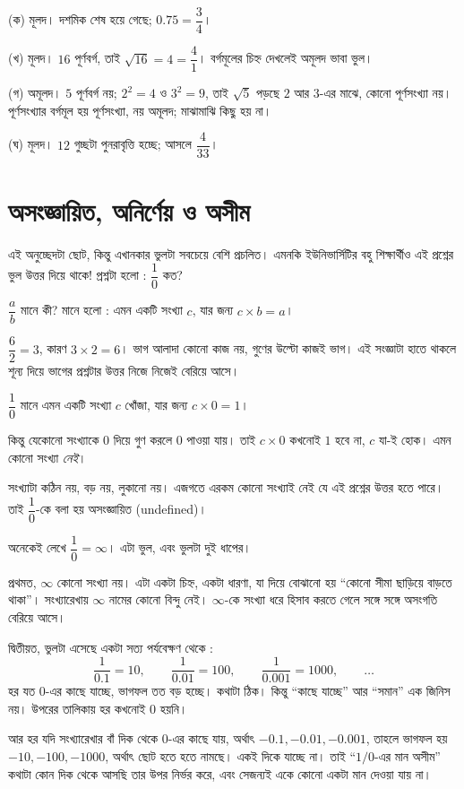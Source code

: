 \documentclass[11pt]{article}
\begin{document}
\begin{solbox}
(ক) মূলদ। দশমিক শেষ হয়ে গেছে; $0.75 = \dfrac{3}{4}$।

(খ) মূলদ। $16$ পূর্ণবর্গ, তাই $\sqrt{16} = 4 = \dfrac{4}{1}$। বর্গমূলের চিহ্ন
দেখলেই অমূলদ ভাবা ভুল।

(গ) অমূলদ। $5$ পূর্ণবর্গ নয়; $2^2 = 4$ ও $3^2 = 9$, তাই $\sqrt{5}$ পড়ছে $2$
আর $3$-এর মাঝে, কোনো পূর্ণসংখ্যা নয়। পূর্ণসংখ্যার বর্গমূল হয় পূর্ণসংখ্যা,
নয় অমূলদ; মাঝামাঝি কিছু হয় না।

(ঘ) মূলদ। $12$ গুচ্ছটা পুনরাবৃত্তি হচ্ছে; আসলে $\dfrac{4}{33}$।
\end{solbox}

\section{অসংজ্ঞায়িত, অনির্ণেয় ও অসীম}

\noindent
এই অনুচ্ছেদটা ছোট, কিন্তু এখানকার ভুলটা সবচেয়ে বেশি প্রচলিত। এমনকি ইউনিভার্সিটির বহু শিক্ষার্থীও এই প্রশ্নের ভুল উত্তর দিয়ে থাকে! প্রশ্নটা হলো :
$\dfrac{1}{0}$ কত?

\begin{idea}[ভাগের আসল সংজ্ঞা]
$\dfrac{a}{b}$ মানে কী? মানে হলো : এমন একটি সংখ্যা $c$, যার জন্য
$c \times b = a$।

$\dfrac{6}{2} = 3$, কারণ $3 \times 2 = 6$। ভাগ আলাদা কোনো কাজ নয়, গুণের
উল্টো কাজই ভাগ। এই সংজ্ঞাটা হাতে থাকলে শূন্য দিয়ে ভাগের প্রশ্নটার উত্তর নিজে
নিজেই বেরিয়ে আসে।
\end{idea}

\begin{idea}[$1/0$ কেন অসংজ্ঞায়িত]
$\dfrac{1}{0}$ মানে এমন একটি সংখ্যা $c$ খোঁজা, যার জন্য $c \times 0 = 1$।

কিন্তু যেকোনো সংখ্যাকে $0$ দিয়ে গুণ করলে $0$ পাওয়া যায়। তাই $c \times 0$
কখনোই $1$ হবে না, $c$ যা-ই হোক। এমন কোনো সংখ্যা \emph{নেই}।

সংখ্যাটা কঠিন নয়, বড় নয়, লুকানো নয়। এজগতে এরকম কোনো সংখ্যাই নেই যে এই প্রশ্নের উত্তর হতে পারে। তাই $\dfrac{1}{0}$-কে বলা হয়
অসংজ্ঞায়িত (undefined)।
\end{idea}

\begin{idea}[$1/0 = \infty$ কথাটা ভুল]
অনেকেই লেখে $\dfrac{1}{0} = \infty$। এটা ভুল, এবং ভুলটা দুই ধাপের।

প্রথমত, $\infty$ কোনো সংখ্যা নয়। এটা একটা চিহ্ন, একটা ধারণা, যা দিয়ে বোঝানো হয় ``কোনো
সীমা ছাড়িয়ে বাড়তে থাকা''। সংখ্যারেখায় $\infty$ নামের কোনো বিন্দু নেই।
$\infty$-কে সংখ্যা ধরে হিসাব করতে গেলে সঙ্গে সঙ্গে অসংগতি বেরিয়ে আসে।

দ্বিতীয়ত, ভুলটা এসেছে একটা সত্য পর্যবেক্ষণ থেকে :
\[
  \frac{1}{0.1} = 10, \qquad
  \frac{1}{0.01} = 100, \qquad
  \frac{1}{0.001} = 1000, \qquad \dots
\]
হর যত $0$-এর কাছে যাচ্ছে, ভাগফল তত বড় হচ্ছে। কথাটা ঠিক। কিন্তু ``কাছে যাচ্ছে''
আর ``সমান'' এক জিনিস নয়। উপরের তালিকায় হর কখনোই $0$ হয়নি।

আর হর যদি সংখ্যারেখার বাঁ দিক থেকে $0$-এর কাছে যায়, অর্থাৎ $-0.1, -0.01, -0.001$, তাহলে
ভাগফল হয় $-10, -100, -1000$, অর্থাৎ ছোট হতে হতে নামছে। একই দিকে যাচ্ছে না।
তাই ``$1/0$-এর মান অসীম'' কথাটা কোন দিক থেকে আসছি তার উপর নির্ভর করে, এবং
সেজন্যই একে কোনো একটা মান দেওয়া যায় না।
\end{idea}
\end{document}
